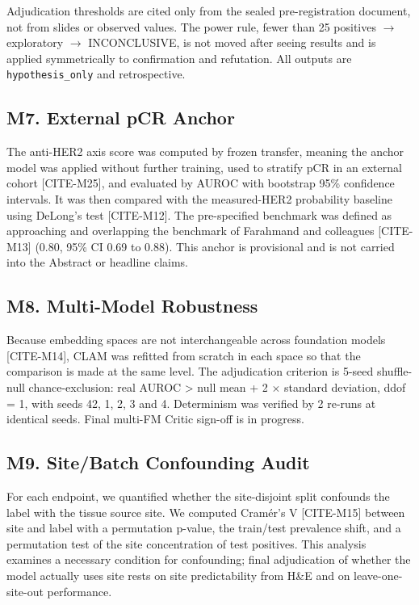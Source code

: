 Adjudication thresholds are cited only from the sealed pre-registration document, not from slides or observed values. The power rule, fewer than 25 positives $\rightarrow$ exploratory $\rightarrow$ INCONCLUSIVE, is not moved after seeing results and is applied symmetrically to confirmation and refutation. All outputs are \texttt{hypothesis\_only} and retrospective.

\subsection*{M7. External pCR Anchor}

The anti-HER2 axis score was computed by frozen transfer, meaning the anchor model was applied without further training, used to stratify pCR in an external cohort [CITE-M25], and evaluated by AUROC with bootstrap 95\% confidence intervals. It was then compared with the measured-HER2 probability baseline using DeLong's test [CITE-M12]. The pre-specified benchmark was defined as approaching and overlapping the benchmark of Farahmand and colleagues [CITE-M13] (0.80, 95\% CI 0.69 to 0.88). This anchor is provisional and is not carried into the Abstract or headline claims.

\subsection*{M8. Multi-Model Robustness}

Because embedding spaces are not interchangeable across foundation models [CITE-M14], CLAM was refitted from scratch in each space so that the comparison is made at the same level. The adjudication criterion is 5-seed shuffle-null chance-exclusion: real AUROC > null mean + 2 $\times$ standard deviation, ddof = 1, with seeds 42, 1, 2, 3 and 4. Determinism was verified by 2 re-runs at identical seeds. Final multi-FM Critic sign-off is in progress.

\subsection*{M9. Site/Batch Confounding Audit}

For each endpoint, we quantified whether the site-disjoint split confounds the label with the tissue source site. We computed Cram\'er's V [CITE-M15] between site and label with a permutation p-value, the train/test prevalence shift, and a permutation test of the site concentration of test positives. This analysis examines a necessary condition for confounding; final adjudication of whether the model actually uses site rests on site predictability from H\&E and on leave-one-site-out performance.

